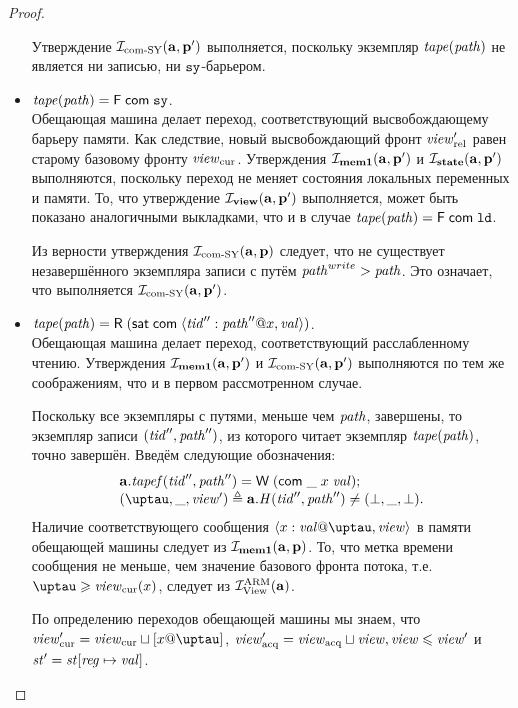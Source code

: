 \begin{proof}
\begin{itemize}
     Утверждение $\mathcal{I}_{\textup{\rm com-SY}}(\mathbf{a}, \mathbf{p}')$ выполняется, поскольку экземпляр $\mathit{tape}(\mathit{path})$ не является ни записью,
     ни $\mathtt{sy}$-барьером.

   \item $\mathit{tape}(\mathit{path}) = \textsf{F} \; \mathsf{com} \; \mathtt{sy}$. \\
    Обещающая машина делает переход, соответствующий высвобождающему барьеру памяти.
    Как следствие, новый высвобождающий фронт $\mathit{view}_{\mathrm{rel}}'$ равен старому базовому фронту $\mathit{view}_{\mathrm{cur}}$.
    Утверждения $\mathcal{I}_{\rm \bf mem1}(\mathbf{a}, \mathbf{p}')$ и $\mathcal{I}_{\rm \bf state}(\mathbf{a}, \mathbf{p}')$ выполняются, поскольку
    переход не меняет состояния локальных переменных и памяти.
    То, что утверждение $\mathcal{I}_{\rm \bf view}(\mathbf{a}, \mathbf{p}')$ выполняется, может быть показано аналогичными выкладками,
    что и в случае $\mathit{tape}(\mathit{path}) = \textsf{F} \; \mathsf{com} \; \mathtt{ld}$.
     
    Из верности утверждения $\mathcal{I}_{\textup{\rm com-SY}}(\mathbf{a}, \mathbf{p})$ следует, что
    не существует незавершённого экземпляра записи с путём $\mathit{path}^{write} > \mathit{path}$.
    Это означает, что выполняется $\mathcal{I}_{\textup{\rm com-SY}}(\mathbf{a}, \mathbf{p}')$.

  \item $\mathit{tape}(\mathit{path}) = \textsf{R} \; (\mathsf{sat} \; \mathsf{com} \; \langle \mathit{tid}'': \mathit{path}''@ x,\mathit{val} \rangle)$. \\
    Обещающая машина делает переход, соответствующий расслабленному чтению.
    Утверждения $\mathcal{I}_{\rm \bf mem1}(\mathbf{a}, \mathbf{p}')$ и $\mathcal{I}_{\textup{\rm com-SY}}(\mathbf{a}, \mathbf{p}')$
    выполняются по тем же соображениям, что и в первом рассмотренном случае.

    Поскольку все экземпляры с путями, меньше чем $\mathit{path}$, завершены, то
    экземпляр записи $(\mathit{tid}'', \mathit{path}'')$, из которого читает экземпляр $\mathit{tape}(\mathit{path})$, точно завершён.
    Введём следующие обозначения:
    \[\begin{array}{l}
    \aT.\tapef(\tId'', \cpath'') = \tapeWrite{(\tapeWriteCommitted{\_}{x}{\stval})}; \\
    (\tau, \_, \R') \triangleq \aT.\hmap(\tId'', \cpath'') \not = (\bot, \_ , \bot). \\
    \end{array}\]
    Наличие соответствующего сообщения $\writeEvt{x}{\stval}{\tau}{\R}$ в памяти обещающей машины
    следует из $\mathcal{I}_{\rm \bf mem1}(\mathbf{a}, \mathbf{p})$.
    То, что метка времени сообщения не меньше, чем значение базового фронта потока, т.е. $\tau \ge \Rcur(x)$,
    следует из $\mathcal{I}^\text{ARM}_{\textup{\rm {View}}}(\mathbf{a})$.
  
  По определению переходов обещающей машины мы знаем, что
  $\Rcur' = \Rcur \sqcup [x@\tau]$, $\mathit{view}_{\mathrm{acq}}' = \mathit{view}_{\mathrm{acq}} \sqcup \mathit{view}, \mathit{view} \leqslant \mathit{view}'$ и $\mathit{st}' = \mathit{st}[\mathit{reg} \mapsto \mathit{val}]$.


\end{itemize}
\end{proof}
